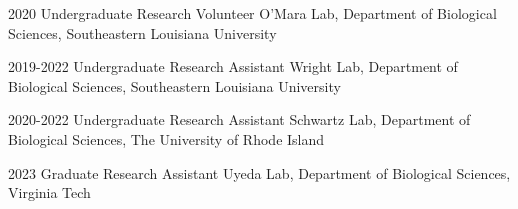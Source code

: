 

\begin{cvskills}

 \cvskill
    {2020} %
    {Undergraduate Research Volunteer} %
    {O'Mara Lab, Department of Biological Sciences, Southeastern Louisiana University} %


 \cvskill
    {2019-2022} %
    {Undergraduate Research Assistant} %
    {Wright Lab, Department of Biological Sciences, Southeastern Louisiana University} %


  \cvskill
    {2020-2022} %
    {Undergraduate Research Assistant} %
    {Schwartz Lab, Department of Biological Sciences, The University of Rhode Island} %


  \cvskill
    {2023} %
    {Graduate Research Assistant\textbf{}} %
    {Uyeda Lab, Department of Biological Sciences, Virginia Tech} %

\end{cvskills}
